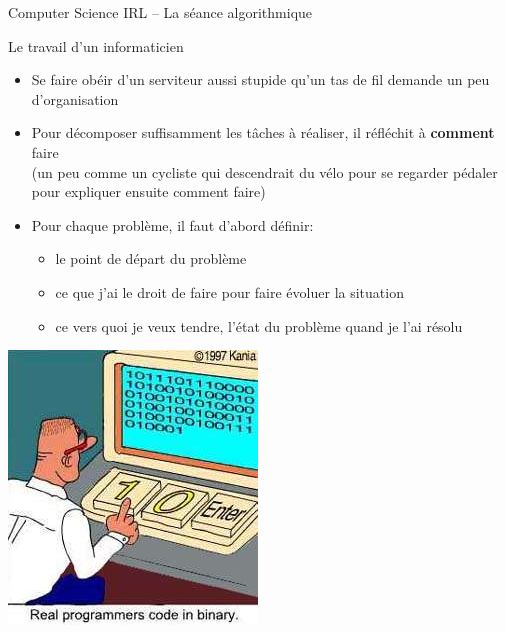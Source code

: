 \documentclass[final,hyperref={pdfpagelabels=false}]{beamer}
\renewenvironment{Coupe}{   }{   }
\renewcommand*{\small}{\fontsize{\resultsmallX}{\resultsmallY}\selectfont}
\begin{document}
\begin{Coupe}
\begin{frame}{Computer Science IRL -- La séance algorithmique}
  \begin{block}{Le travail d'un informaticien}
    \begin{itemize}
    \item Se faire obéir d'un serviteur aussi stupide qu'un tas de fil demande
      un peu d'organisation
    \item Pour décomposer suffisamment les tâches à réaliser, il réfléchit à
      \textbf{comment} faire\\
      {\small (un peu comme un cycliste qui descendrait du vélo pour se regarder
        pédaler pour expliquer ensuite comment faire)}
    \item Pour chaque problème, il faut d'abord définir:
      \begin{itemize}
      \item {} le point de départ du problème
      \item {} ce que j'ai le droit de faire pour faire
        évoluer la situation
      \item {} ce vers quoi je veux tendre, l'état
        du problème quand je l'ai résolu
      \end{itemize}
    \end{itemize}
  \end{block}

  \bigskip\bigskip
  \bigskip\bigskip
  \centerline{\includegraphics[width=.25\linewidth]{img/realprogrammers.jpg}\label{img:realprog}}
\end{frame}
\newcommand{\clou}[3]{\draw[#3,line width=2pt] (.5*#1,.6*#2) -- +(.3,0) --  +(.15,0) -- +(.15,.5);}
\newcommand{\clous}[2]{\foreach \x/\y in {#2} {\clou{\x}{\y}{#1}}}


\end{Coupe}
\end{document}
